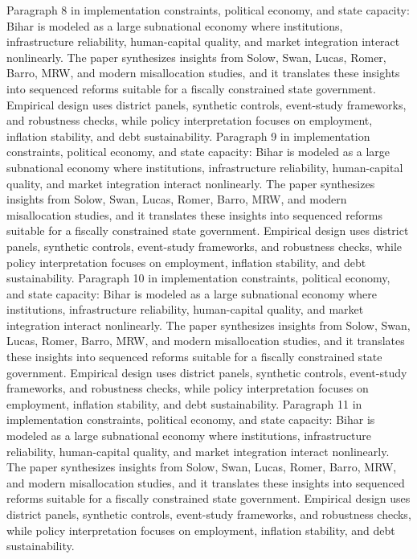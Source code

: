 \documentclass[preprint,12pt]{elsarticle}
\begin{document}
Paragraph 8 in implementation constraints, political economy, and state capacity: Bihar is modeled as a large subnational economy where institutions, infrastructure reliability, human-capital quality, and market integration interact nonlinearly. The paper synthesizes insights from Solow, Swan, Lucas, Romer, Barro, MRW, and modern misallocation studies, and it translates these insights into sequenced reforms suitable for a fiscally constrained state government. Empirical design uses district panels, synthetic controls, event-study frameworks, and robustness checks, while policy interpretation focuses on employment, inflation stability, and debt sustainability.
Paragraph 9 in implementation constraints, political economy, and state capacity: Bihar is modeled as a large subnational economy where institutions, infrastructure reliability, human-capital quality, and market integration interact nonlinearly. The paper synthesizes insights from Solow, Swan, Lucas, Romer, Barro, MRW, and modern misallocation studies, and it translates these insights into sequenced reforms suitable for a fiscally constrained state government. Empirical design uses district panels, synthetic controls, event-study frameworks, and robustness checks, while policy interpretation focuses on employment, inflation stability, and debt sustainability.
Paragraph 10 in implementation constraints, political economy, and state capacity: Bihar is modeled as a large subnational economy where institutions, infrastructure reliability, human-capital quality, and market integration interact nonlinearly. The paper synthesizes insights from Solow, Swan, Lucas, Romer, Barro, MRW, and modern misallocation studies, and it translates these insights into sequenced reforms suitable for a fiscally constrained state government. Empirical design uses district panels, synthetic controls, event-study frameworks, and robustness checks, while policy interpretation focuses on employment, inflation stability, and debt sustainability.
Paragraph 11 in implementation constraints, political economy, and state capacity: Bihar is modeled as a large subnational economy where institutions, infrastructure reliability, human-capital quality, and market integration interact nonlinearly. The paper synthesizes insights from Solow, Swan, Lucas, Romer, Barro, MRW, and modern misallocation studies, and it translates these insights into sequenced reforms suitable for a fiscally constrained state government. Empirical design uses district panels, synthetic controls, event-study frameworks, and robustness checks, while policy interpretation focuses on employment, inflation stability, and debt sustainability.
\end{document}

